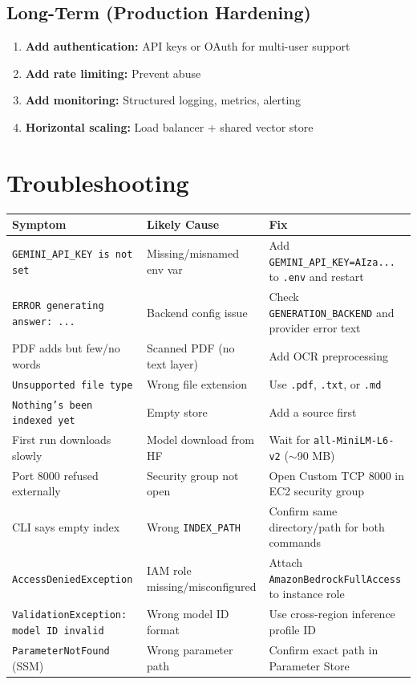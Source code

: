 \documentclass[11pt,a4paper]{paper}
\begin{document}
\subsection{Long-Term (Production Hardening)}

\begin{enumerate}
  \item \textbf{Add authentication:} API keys or OAuth for multi-user support
  \item \textbf{Add rate limiting:} Prevent abuse
  \item \textbf{Add monitoring:} Structured logging, metrics, alerting
  \item \textbf{Horizontal scaling:} Load balancer + shared vector store
\end{enumerate}

\section{Troubleshooting}
\label{sec:troubleshooting}

\begin{longtable}{>{\raggedright}p{4.5cm} >{\raggedright}p{4.0cm} >{\raggedright\arraybackslash}p{6.0cm}}
\toprule
\textbf{Symptom} & \textbf{Likely Cause} & \textbf{Fix} \\
\midrule
\endhead
\texttt{GEMINI\_API\_KEY is not set} & Missing/misnamed env var & Add \texttt{GEMINI\_API\_KEY=AIza...} to \texttt{.env} and restart \\
\texttt{ERROR generating answer: ...} & Backend config issue & Check \texttt{GENERATION\_BACKEND} and provider error text \\
PDF adds but few/no words & Scanned PDF (no text layer) & Add OCR preprocessing \\
\texttt{Unsupported file type} & Wrong file extension & Use \texttt{.pdf}, \texttt{.txt}, or \texttt{.md} \\
\texttt{Nothing's been indexed yet} & Empty store & Add a source first \\
First run downloads slowly & Model download from HF & Wait for \texttt{all-MiniLM-L6-v2} ($\sim$90 MB) \\
Port 8000 refused externally & Security group not open & Open Custom TCP 8000 in EC2 security group \\
CLI says empty index & Wrong \texttt{INDEX\_PATH} & Confirm same directory/path for both commands \\
\texttt{AccessDeniedException} & IAM role missing/misconfigured & Attach \texttt{AmazonBedrockFullAccess} to instance role \\
\texttt{ValidationException: model ID invalid} & Wrong model ID format & Use cross-region inference profile ID \\
\texttt{ParameterNotFound} (SSM) & Wrong parameter path & Confirm exact path in Parameter Store \\
\bottomrule
\end{longtable}
\label{tab:troubleshooting}
\end{document}
